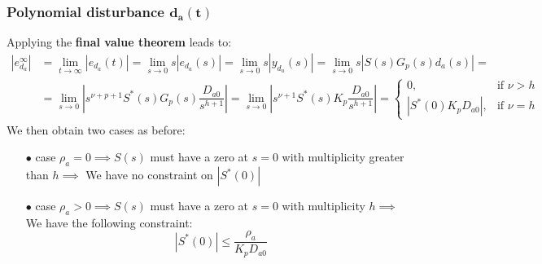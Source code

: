 \documentclass{article}
\numberwithin{equation}{subsection}
\begin{document}
	\subsubsection{Polynomial disturbance $\bm{d_a(t)}$}
	Applying the \textbf{final value theorem} leads to:
	\begin{align}
		\left| e_{d_a}^\infty \right| &= \displaystyle\lim_{t\to\infty} 	\left|e_{d_a}(t)\right| = \displaystyle\lim_{s\to0}s \left|e_{d_a}(s)\right| = \displaystyle\lim_{s\to0}s \left|y_{d_a}(s)\right| = \displaystyle\lim_{s\to0}s \left| S(s)G_p(s)d_a(s) \right| = \nonumber \\
		&= \displaystyle\lim_{s\to0} 	\left|s^{\nu+p+1}S^*(s)G_p(s)\dfrac{D_{a0}}{s^{h+1}}\right| = \displaystyle\lim_{s\to0} \left|s^{\nu+1}S^*(s)K_p\dfrac{D_{a0}}{s^{h+1}}\right| =
		\begin{cases}
			0, & \text{if } \nu>h \\
			\left|S^*(0)K_pD_{a0}\right|, & \text{if } \nu = h
		\end{cases}
	\end{align}
	We then obtain two cases as before:
	\begin{enumerate}
		\item[$\bullet$] case $\rho_a=0 \implies S(s)$ must have a zero at $s=0$ with multiplicity greater than $h \implies$ We have no constraint on $\left|S^*(0)\right| $ 
		\item[$\bullet$] case $\rho_a>0 \implies S(s)$ must have a zero at $s=0$ with multiplicity $h \implies$ We have the following constraint:
		\begin{equation}
			\left|S^*(0)\right| \leq \dfrac{\rho_a}{K_pD_{a0}}	
		\end{equation}
	\end{enumerate}
	
\end{document}

